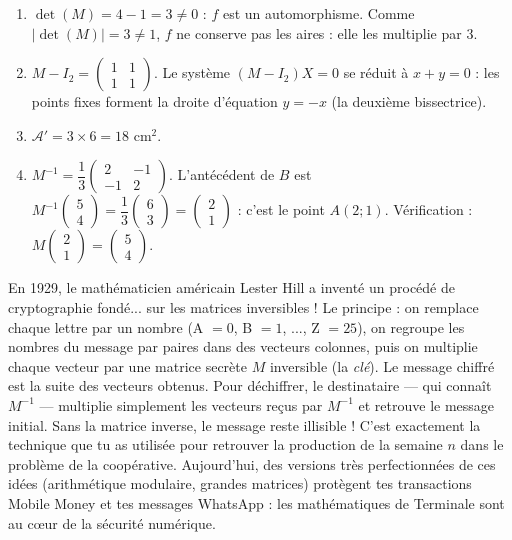 \documentclass[11pt]{article}
\begin{document}
\begin{corrige}[Exercice 1]
\begin{enumerate}
\item $\det(M) = 4 - 1 = 3 \neq 0$ : $f$ est un automorphisme. Comme $|\det(M)| = 3 \neq 1$, $f$ ne conserve pas les aires : elle les multiplie par $3$.
\item $M - I_2 = \begin{pmatrix} 1 & 1 \\ 1 & 1 \end{pmatrix}$. Le système $(M - I_2)X = 0$ se réduit à $x + y = 0$ : les points fixes forment la droite d'équation $y = -x$ (la deuxième bissectrice).
\item $\mathcal{A}' = 3 \times 6 = 18$ cm$^2$.
\item $M^{-1} = \dfrac{1}{3}\begin{pmatrix} 2 & -1 \\ -1 & 2 \end{pmatrix}$. L'antécédent de $B$ est $M^{-1}\begin{pmatrix} 5 \\ 4 \end{pmatrix} = \dfrac{1}{3}\begin{pmatrix} 6 \\ 3 \end{pmatrix} = \begin{pmatrix} 2 \\ 1 \end{pmatrix}$ : c'est le point $A(2;1)$. Vérification : $M\begin{pmatrix} 2 \\ 1 \end{pmatrix} = \begin{pmatrix} 5 \\ 4 \end{pmatrix}$.
\end{enumerate}
\end{corrige}

\begin{savaistu}
En 1929, le mathématicien américain Lester Hill a inventé un procédé de cryptographie fondé... sur les matrices inversibles ! Le principe : on remplace chaque lettre par un nombre (A $= 0$, B $= 1$, ..., Z $= 25$), on regroupe les nombres du message par paires dans des vecteurs colonnes, puis on multiplie chaque vecteur par une matrice secrète $M$ inversible (la \emph{clé}). Le message chiffré est la suite des vecteurs obtenus. Pour déchiffrer, le destinataire — qui connaît $M^{-1}$ — multiplie simplement les vecteurs reçus par $M^{-1}$ et retrouve le message initial. Sans la matrice inverse, le message reste illisible ! C'est exactement la technique que tu as utilisée pour retrouver la production de la semaine $n$ dans le problème de la coopérative. Aujourd'hui, des versions très perfectionnées de ces idées (arithmétique modulaire, grandes matrices) protègent tes transactions Mobile Money et tes messages WhatsApp : les mathématiques de Terminale sont au cœur de la sécurité numérique.
\end{savaistu}
\end{document}
